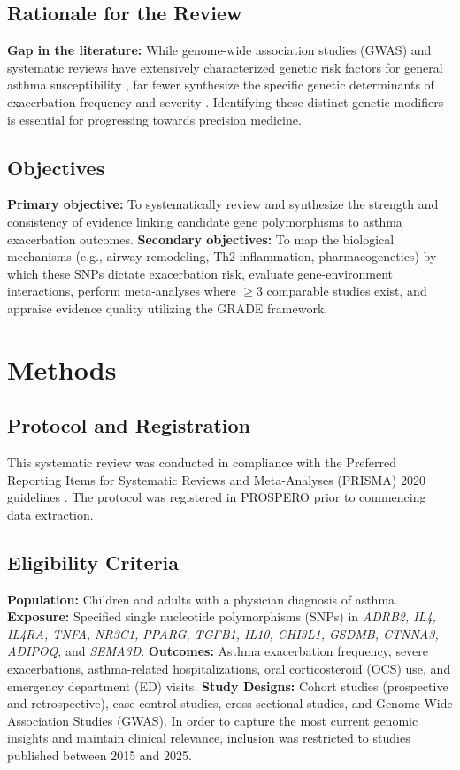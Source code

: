 \documentclass[11pt,a4paper]{article}
\begin{document}
\subsection{Rationale for the Review}
\textbf{Gap in the literature:} While genome-wide association studies (GWAS) and systematic reviews have extensively characterized genetic risk factors for general asthma susceptibility \cite{VicenteRevez2017}, far fewer synthesize the specific genetic determinants of exacerbation frequency and severity \cite{WangTantisira2016}. Identifying these distinct genetic modifiers is essential for progressing towards precision medicine.

\subsection{Objectives}
\textbf{Primary objective:} To systematically review and synthesize the strength and consistency of evidence linking candidate gene polymorphisms to asthma exacerbation outcomes.
\textbf{Secondary objectives:} To map the biological mechanisms (e.g., airway remodeling, Th2 inflammation, pharmacogenetics) by which these SNPs dictate exacerbation risk, evaluate gene-environment interactions, perform meta-analyses where $\ge 3$ comparable studies exist, and appraise evidence quality utilizing the GRADE framework.

\section{Methods}

\subsection{Protocol and Registration}
This systematic review was conducted in compliance with the Preferred Reporting Items for Systematic Reviews and Meta-Analyses (PRISMA) 2020 guidelines \cite{Page2021}. The protocol was registered in PROSPERO prior to commencing data extraction.

\subsection{Eligibility Criteria}
\textbf{Population:} Children and adults with a physician diagnosis of asthma.
\textbf{Exposure:} Specified single nucleotide polymorphisms (SNPs) in \textit{ADRB2, IL4, IL4RA, TNFA, NR3C1, PPARG, TGFB1, IL10, CHI3L1, GSDMB, CTNNA3, ADIPOQ}, and \textit{SEMA3D}.
\textbf{Outcomes:} Asthma exacerbation frequency, severe exacerbations, asthma-related hospitalizations, oral corticosteroid (OCS) use, and emergency department (ED) visits.
\textbf{Study Designs:} Cohort studies (prospective and retrospective), case-control studies, cross-sectional studies, and Genome-Wide Association Studies (GWAS). In order to capture the most current genomic insights and maintain clinical relevance, inclusion was restricted to studies published between 2015 and 2025.
\end{document}
